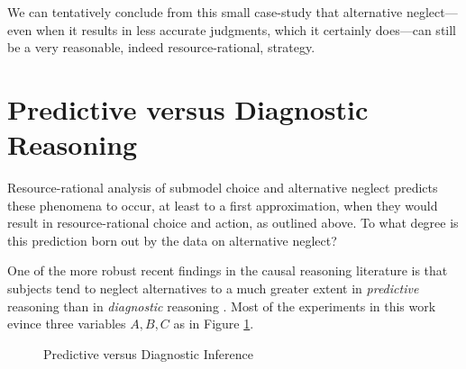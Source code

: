 \documentclass[10pt,letterpaper]{article}
\begin{document}
We can tentatively conclude from this small case-study that alternative neglect---even when it results in less accurate judgments, which it certainly does---can still be a very reasonable, indeed resource-rational, strategy. 

\section{Predictive versus Diagnostic Reasoning}

Resource-rational analysis of submodel choice and alternative neglect predicts these phenomena to occur, at least to a first approximation, when they would result in resource-rational choice and action, as outlined above. To what degree is this prediction born out by the data on alternative neglect?

One of the more robust recent findings in the causal reasoning literature is that subjects tend to neglect alternatives to a much greater extent in \emph{predictive} reasoning than in \emph{diagnostic} reasoning \citep{Fernbach2011,Fernbach2013}. Most of the experiments in this work evince three variables $A,B,C$ as in Figure \ref{diagnostic}.
\begin{figure}[h] \begin{center}
\hspace{.7in}
   \end{center}
 \caption{Predictive versus Diagnostic Inference} \label{diagnostic}
\end{figure}
\end{document}
